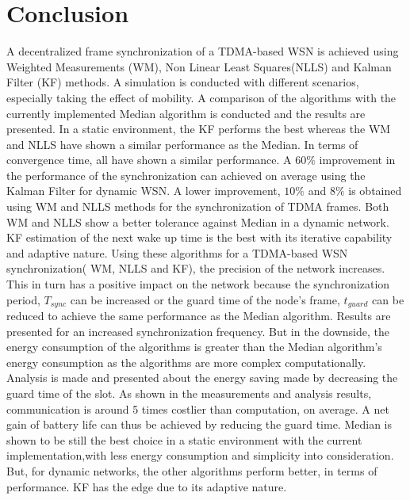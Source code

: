 \documentclass[a4paper,10pt]{report}
\begin{document}
\section{\textbf{Conclusion}}
A decentralized frame synchronization of a TDMA-based WSN is achieved using Weighted Measurements (WM), Non Linear Least Squares(NLLS) and Kalman Filter (KF) methods. A simulation is conducted with different scenarios, especially taking the effect of mobility. A comparison of the algorithms with the currently implemented Median algorithm is conducted and the results are presented.
\newline
In a static environment, the KF performs the best whereas the WM and NLLS have shown a similar performance as the Median. In terms of convergence time, all have shown a similar performance.
\newline
A $60\%$ improvement in the performance of the synchronization can achieved on average using the Kalman Filter for dynamic WSN. A lower improvement, $10\%$ and $8\%$ is obtained using WM and NLLS methods for the synchronization of TDMA frames. Both WM and NLLS show a better tolerance against Median in a dynamic network. KF estimation of the next wake up time is the best with its iterative capability and adaptive nature.
\newline
Using these algorithms for a TDMA-based WSN synchronization( WM, NLLS and KF), the precision of the network increases. This in turn has a positive impact on the network because the synchronization period, $T_{sync}$ can be increased or the guard time of the node's frame, $t_{guard}$ can be reduced to achieve the same performance as the Median algorithm. Results are presented for an increased synchronization frequency.
\newline
But in the downside, the energy consumption of the algorithms is greater than the Median algorithm's energy consumption as the algorithms are more complex computationally. Analysis is made and presented about the energy saving made by decreasing the guard time of the slot. As shown in the measurements and analysis results, communication is around 5 times costlier than computation, on average. A net gain of battery life can thus be achieved by reducing the guard time.
\newline
Median is shown to be still the best choice in a static environment with the current implementation,with less energy consumption and simplicity into consideration. But, for dynamic networks, the other algorithms perform better, in terms of performance. KF has the edge due to its adaptive nature.
\end{document}
